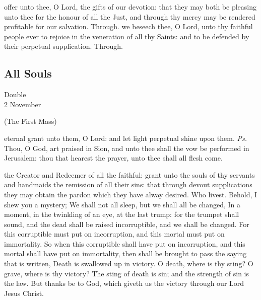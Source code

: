 \secret
{} offer unto thee, O Lord, the gifts of our devotion: that they may both be pleasing unto thee for the honour of all the Just, and through thy mercy may be rendered profitable for our salvation. Through.
\postcommunion
{} we beseech thee, O Lord, unto thy faithful people ever to rejoice in the veneration of all thy Saints: and to be defended by their perpetual supplication. Through.

\subsection{All Souls}\label{AllSouls}
\begin{inhead}
    {Double\\
2 November}
\end{inhead}

\centerline{\small{(The First Mass)}}

\introit
{} eternal grant unto them, O Lord: and let light perpetual shine upon them. \textit{Ps.} Thou, O God, art praised in Sion, and unto thee shall the vow be performed in Jerusalem: thou that hearest the prayer, unto thee shall all flesh come.

\collect
{} the Creator and Redeemer of all the faithful: grant unto the souls of thy servants and handmaids the remission of all their sins: that through devout supplications they may obtain the pardon which they have alway desired. Who livest.
 Behold, I shew you a mystery; We shall not all sleep, but we shall all be changed, In a moment, in the twinkling of an eye, at the last trump: for the trumpet shall sound, and the dead shall be raised incorruptible, and we shall be changed. For this corruptible must put on incorruption, and this mortal must put on immortality. So when this corruptible shall have put on incorruption, and this mortal shall have put on immortality, then shall be brought to pass the saying that is written, Death is swallowed up in victory. O death, where is thy sting? O grave, where is thy victory? The sting of death is sin; and the strength of sin is the law. But thanks be to God, which giveth us the victory through our Lord Jesus Christ.

